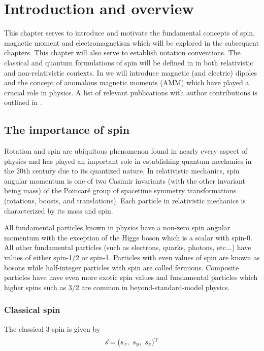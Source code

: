 \chapter{Introduction and overview}
\label{chap:intro}
\noindent This chapter serves to introduce and motivate the fundamental concepts of spin, magnetic moment and electromagnetism which will be explored in the subsequent chapters. This chapter will also serve to establish notation conventions. The classical and quantum formulations of spin will be defined in  in both relativistic and non-relativistic contexts. In  we will introduce magnetic (and electric) dipoles and the concept of anomalous magnetic moments (AMM) which have played a crucial role in physics. A list of relevant publications with author contributions is outlined in .

\section{The importance of spin}
\label{sec:spin}
Rotation and spin are ubiquitous phenomenon found in nearly every aspect of physics and has played an important role in establishing quantum mechanics in the 20th century due to its quantized nature. In relativistic mechanics, spin angular momentum is one of two Casimir invariants (with the other invariant being mass) of the Poincar{\'e} group of spacetime symmetry transformations (rotations, boosts, and translations). Each particle in relativistic mechanics is characterized by its mass and spin.

All fundamental particles known in physics have a non-zero spin angular momentum with the exception of the Higgs boson which is a scalar with spin-0. All other fundamental particles (such as electrons, quarks, photons, etc...) have values of either spin-1/2 or spin-1. Particles with even values of spin are known as bosons while half-integer particles with spin are called fermions. Composite particles have have even more exotic spin values and fundamental particles which higher spins such as 3/2 are common in beyond-standard-model physics.

\subsection{Classical spin}
\label{sec:cspin}
The classical 3-spin is given by
\begin{align}
    \label{cspin:1}
    \vec{s}=(s_{x},\ s_{y},\ s_{z})^{\rm T}
\end{align}

